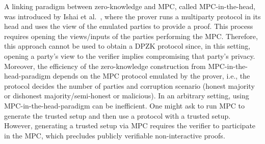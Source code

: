 A linking paradigm between zero-knowledge and MPC, called MPC-in-the-head, was introduced by Ishai et al.~\cite{MPCinthehead}, where the prover runs a multiparty protocol in its head and uses the view of the emulated parties to provide a proof. This process requires opening the views/inputs of the parties performing the MPC. Therefore, this approach cannot be used to obtain a DPZK protocol since, in this setting, opening a party's view to the verifier implies compromising that party's privacy.  Moreover, the efficiency of the zero-knowledge construction from MPC-in-the-head-paradigm depends on the MPC protocol emulated by the prover, i.e., the protocol decides the number of parties and corruption scenario (honest majority or dishonest majority/semi-honest or malicious). In an arbitrary setting, using MPC-in-the-head-paradigm can be inefficient.
One might ask to run MPC to generate the trusted setup and then use a protocol with a trusted setup. However, generating a trusted setup via MPC requires the verifier to participate in the MPC, which precludes publicly verifiable non-interactive proofs.
